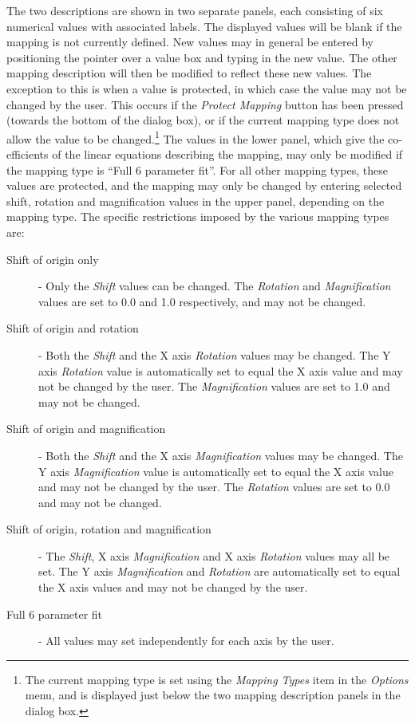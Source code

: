 \documentclass[11pt]{article}
\newcommand{\htmlref}[2]{#1}
\begin{document}
The two descriptions are shown in two separate panels, each consisting of
six numerical values with associated labels. The displayed values will be
blank if the mapping is not currently defined. New values may in general
be entered by positioning the pointer over a value box and typing in the
new value. The other mapping description will then be modified to reflect
these new values. The exception to this is when a value is protected, in
which case the value may not be changed by the user. This occurs if the
\emph{Protect Mapping} button has been pressed (towards the bottom of the
dialog box), or if the current mapping type does not allow the value to
be changed.\footnote{The current mapping type is set using the \htmlref{{\em
Mapping Types}}{POLKA_MAP_TYPES} item in the
\htmlref{\emph{Options}}{POLKA_OPTIONS_MENU} menu, and is displayed just
below the two mapping description panels in the dialog box.} The values
in the lower panel, which give the co-efficients of the linear equations
describing the mapping, may only be modified if the mapping type is
``Full 6 parameter fit''. For all other mapping types, these values are
protected, and the mapping may only be changed by entering selected
shift, rotation and magnification values in the upper panel, depending on
the mapping type. The specific restrictions imposed by the various
mapping types are:


\begin{description}

\item[Shift of origin only] - Only the \emph{Shift} values can be changed.
The \emph{Rotation} and \emph{Magnification} values are set to 0.0 and 1.0
respectively, and may not be changed.

\item[Shift of origin and rotation] - Both the \emph{Shift} and the X axis {\em
Rotation} values may be changed. The Y axis \emph{Rotation} value is
automatically set to equal the X axis value and may not be changed by the
user. The \emph{Magnification} values are set to 1.0 and may not be changed.

\item[Shift of origin and magnification] - Both the \emph{Shift} and the X
axis \emph{Magnification} values may be changed. The Y axis {\em
Magnification} value is automatically set to equal the X axis value and
may not be changed by the user. The \emph{Rotation} values are set to 0.0 and
may not be changed.

\item[Shift of origin, rotation and magnification] - The  \emph{Shift},
X axis \emph{Magnification} and X axis \emph{Rotation} values may all be set.
The Y axis \emph{Magnification} and \emph{Rotation} are automatically set
to equal the X axis values and may not be changed by the user.

\item[Full 6 parameter fit] - All values may set independently for each
axis by the user.
\end{description}
\end{document}
